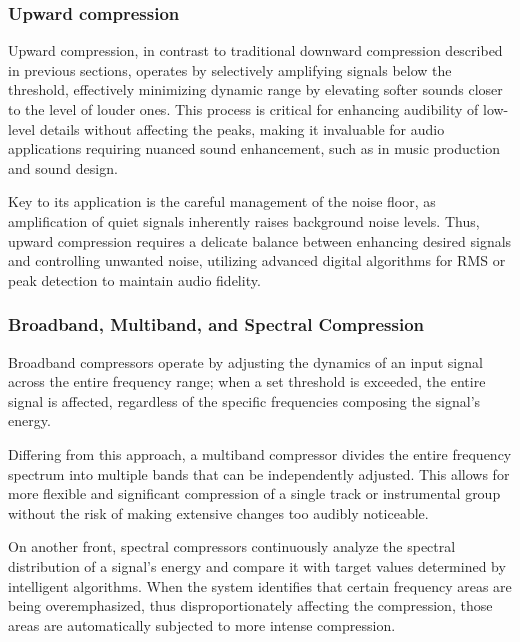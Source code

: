 \documentclass[10pt]{article}
\begin{document}
\begin{multicols*}{2}
                \subsubsection{Upward compression}
                    Upward compression, in contrast to traditional downward compression described in previous sections, operates by selectively amplifying signals below the threshold, effectively minimizing dynamic range by elevating softer sounds closer to the level of louder ones. This process is critical for enhancing audibility of low-level details without affecting the peaks, making it invaluable for audio applications requiring nuanced sound enhancement, such as in music production and sound design.\par
                    Key to its application is the careful management of the noise floor, as amplification of quiet signals inherently raises background noise levels. Thus, upward compression requires a delicate balance between enhancing desired signals and controlling unwanted noise, utilizing advanced digital algorithms for RMS or peak detection to maintain audio fidelity.
        
                \subsubsection{Broadband, Multiband, and Spectral Compression}
                    Broadband compressors operate by adjusting the dynamics of an input signal across the entire frequency range; when a set threshold is exceeded, the entire signal is affected, regardless of the specific frequencies composing the signal's energy.\par
                    Differing from this approach, a multiband compressor divides the entire frequency spectrum into multiple bands that can be independently adjusted. This allows for more flexible and significant compression of a single track or instrumental group without the risk of making extensive changes too audibly noticeable. \par
                    On another front, spectral compressors continuously analyze the spectral distribution of a signal's energy and compare it with target values determined by intelligent algorithms. When the system identifies that certain frequency areas are being overemphasized, thus disproportionately affecting the compression, those areas are automatically subjected to more intense compression.


\end{multicols*}
\end{document}
